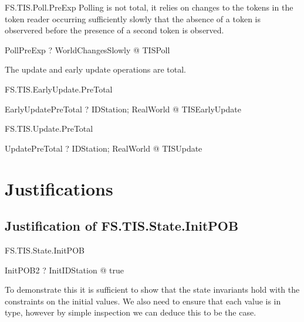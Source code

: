 \begin{Zpobtrace}{FS.TIS.Poll.PreExp}
Polling is not total, it relies on changes to the tokens in the token
reader occurring sufficiently slowly that the absence of a token is
observered before the presence of a second token is observed.
\begin{theorem}{PollPreExp} \vdash? 
\forall WorldChangesSlowly @ \pre TISPoll
\end{theorem}
\end{Zpobtrace}

The update and early update operations are total.

\begin{Zpobtrace}{FS.TIS.EarlyUpdate.PreTotal}
\begin{theorem}{EarlyUpdatePreTotal} \vdash? 
\forall IDStation; RealWorld @ \pre TISEarlyUpdate
\end{theorem}
\end{Zpobtrace}

\begin{Zpobtrace}{FS.TIS.Update.PreTotal}
\begin{theorem}{UpdatePreTotal} \vdash? 
\forall IDStation; RealWorld @ \pre TISUpdate
\end{theorem}
\end{Zpobtrace}


\section{Justifications}

\subsection{Justification of FS.TIS.State.InitPOB}

\begin{Zpobtrace}{FS.TIS.State.InitPOB}
\begin{theorem}{InitPOB2} \vdash? 
\exists InitIDStation @ true
\end{theorem}
\end{Zpobtrace}

To demonstrate this it is sufficient to show that the state invariants
hold with the constraints on the initial values. We also need to
ensure that each value is in type, however by simple inspection we can
deduce this to be the case.

